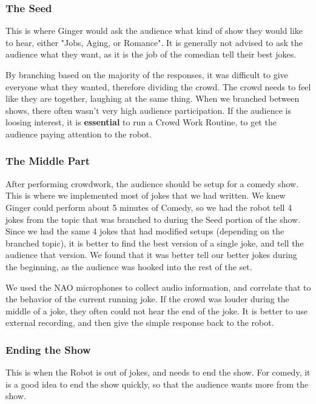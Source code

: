     \subsubsection{The Seed}
    This is where Ginger would ask the audience what kind of show they would like to hear, either "Jobs, Aging, or Romance".
    It is generally not advised to ask the audience what they want, as it is the job of the comedian tell their best jokes.


    By branching based on the majority of the responses, it was difficult to give everyone what they wanted, therefore dividing the crowd.
    The crowd needs to feel like they are together, laughing at the same thing.
    When we branched between shows, there often wasn't very high audience participation.
    If the audience is loosing interest, it is \textbf{essential} to run a Crowd Work Routine, to get the audience paying attention to the robot.
    \subsubsection{The Middle Part}

    After performing crowdwork, the audience should be setup for a comedy show. This is where we implemented most of jokes that we had written.
    We knew Ginger could perform about 5 minutes of Comedy, so we had the robot tell 4 jokes from the topic that was branched to during the Seed portion of the show.
    Since we had the same 4 jokes that had modified setups (depending on the branched topic), it is better to find the best version of a single joke, and tell the audience that version. We found that it was better tell our better jokes during the beginning, as the audience was hooked into the rest of the set.

    We used the NAO microphones to collect audio information, and correlate that to the behavior of the current running joke.
    If the crowd was louder during the middle of a joke, they often could not hear the end of the joke.
    It is better to use external recording, and then give the simple response back to the robot.

    \subsubsection{Ending the Show}

    This is when the Robot is out of jokes, and needs to end the show.
    For comedy, it is a good idea to end the show quickly, so that the audience wants more from the show.

